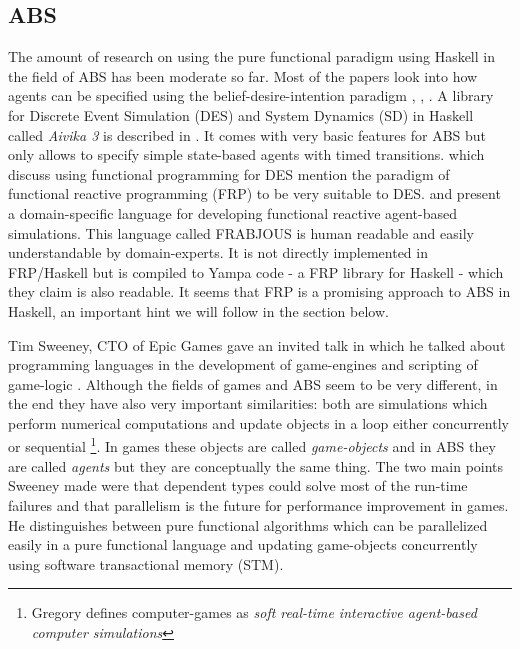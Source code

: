 \subsection{ABS}
The amount of research on using the pure functional paradigm using Haskell in the field of ABS has been moderate so far. Most of the papers look into how agents can be specified using the belief-desire-intention paradigm \cite{de_jong_suitability_2014}, \cite{sulzmann_specifying_2007}, \cite{jankovic_functional_2007}. A library for Discrete Event Simulation (DES) and System Dynamics (SD) in Haskell called \textit{Aivika 3} is described in \cite{sorokin_aivika_2015}. It comes with very basic features for ABS but only allows to specify simple state-based agents with timed transitions.
\cite{jankovic_functional_2007} which discuss using functional programming for DES mention the paradigm of functional reactive programming (FRP) to be very suitable to DES. \cite{schneider_towards_2012} and \cite{vendrov_frabjous:_2014} present a domain-specific language for developing functional reactive agent-based simulations. This language called FRABJOUS is human readable and easily understandable by domain-experts. It is not directly implemented in FRP/Haskell but is compiled to Yampa code - a FRP library for Haskell - which they claim is also readable. It seems that FRP is a promising approach to ABS in Haskell, an important hint we will follow in the section below.

Tim Sweeney, CTO of Epic Games gave an invited talk in which he talked about programming languages in the development of game-engines and scripting of game-logic \cite{sweeney_next_2006}. Although the fields of games and ABS seem to be very different, in the end they have also very important similarities: both are simulations which perform numerical computations and update objects in a loop either concurrently or sequential \footnote{Gregory \cite{gregory_game_2018} defines computer-games as \textit{soft real-time interactive agent-based computer simulations}}. In games these objects are called \textit{game-objects} and in ABS they are called \textit{agents} but they are conceptually the same thing. The two main points Sweeney made were that dependent types could solve most of the run-time failures and that parallelism is the future for performance improvement in games. He distinguishes between pure functional algorithms which can be parallelized easily in a pure functional language and updating game-objects concurrently using software transactional memory (STM).


